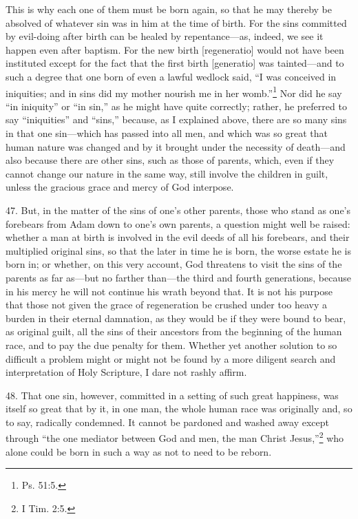 This is why each one of them must be born again, so that he may thereby be absolved of whatever sin was in him at the time of birth. For the sins committed by evil-doing after birth can be healed by repentance—as, indeed, we see it happen even after baptism. For the new birth [regeneratio] would not have been instituted except for the fact that the first birth [generatio] was tainted—and to such a degree that one born of even a lawful wedlock said, ``I was conceived in iniquities; and in sins did my mother nourish me in her womb.''\footnote{Ps. 51:5.} Nor did he say ``in iniquity'' or ``in sin,'' as he might have quite correctly; rather, he preferred to say ``iniquities'' and ``sins,'' because, as I explained above, there are so many sins in that one sin—which has passed into all men, and which was so great that human nature was changed and by it brought under the necessity of death—and also because there are other sins, such as those of parents, which, even if they cannot change our nature in the same way, still involve the children in guilt, unless the gracious grace and mercy of God interpose.

47. But, in the matter of the sins of one's other parents, those who stand as one's forebears from Adam down to one's own parents, a question might well be raised: whether a man at birth is involved in the evil deeds of all his forebears, and their multiplied original sins, so that the later in time he is born, the worse estate he is born in; or whether, on this very account, God threatens to visit the sins of the parents as far as—but no farther than—the third and fourth generations, because in his mercy he will not continue his wrath beyond that. It is not his purpose that those not given the grace of regeneration be crushed under too heavy a burden in their eternal damnation, as they would be if they were bound to bear, as original guilt, all the sins of their ancestors from the beginning of the human race, and to pay the due penalty for them. Whether yet another solution to so difficult a problem might or might not be found by a more diligent search and interpretation of Holy Scripture, I dare not rashly affirm.


48. That one sin, however, committed in a setting of such great happiness, was itself so great that by it, in one man, the whole human race was originally and, so to say, radically condemned. It cannot be pardoned and washed away except through ``the one mediator between God and men, the man Christ Jesus,''\footnote{I Tim. 2:5.} who alone could be born in such a way as not to need to be reborn.

